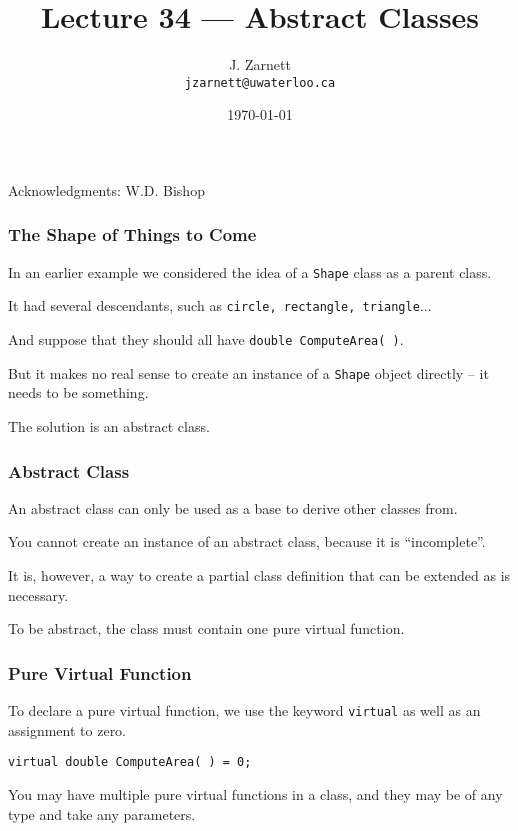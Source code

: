 

\title{Lecture 34 --- Abstract Classes }

\author{J. Zarnett\\
\texttt{jzarnett@uwaterloo.ca}}
\date{\today}



\begin{frame}
  \titlepage
  
  \begin{center}
  \small{Acknowledgments: W.D. Bishop}
  \end{center}
\end{frame}



\begin{frame}
\frametitle{The Shape of Things to Come}

In an earlier example we considered the idea of a \texttt{Shape} class as a parent class.

It had several descendants, such as \texttt{circle, rectangle, triangle}...

And suppose that they should all have \texttt{double ComputeArea( )}.

But it makes no real sense to create an instance of a \texttt{Shape} object directly -- it needs to be something.

The solution is an \alert{abstract class}.

\end{frame}



\begin{frame}
\frametitle{Abstract Class}

An abstract class can only be used as a base to derive other classes from.

You cannot create an instance of an abstract class, because it is ``incomplete''.

It is, however, a way to create a partial class definition that can be extended as is necessary. 

To be abstract, the class must contain one \alert{pure virtual function}.

\end{frame}



\begin{frame}
\frametitle{Pure Virtual Function}

To declare a pure virtual function, we use the keyword \texttt{virtual} as well as an assignment to zero.

\texttt{virtual double ComputeArea( ) = 0;}

You may have multiple pure virtual functions in a class, and they may be of any type and take any parameters.

\end{frame}



